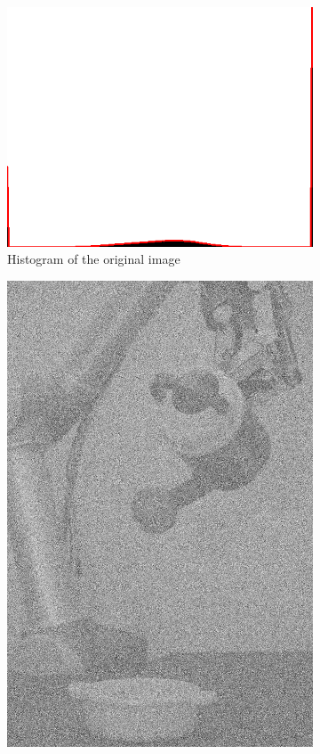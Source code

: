 \begin{figure}[H]
\begin{subfigure}[b]{0.16\textwidth}
        \includegraphics[width=\textwidth]{img2/hist.png}
        \caption{Histogram of the original image}
        \label{fig:img2_hist}
    \end{subfigure}
	 \begin{subfigure}[b]{0.16\textwidth}
        \includegraphics[width=\textwidth]{img2/src.png}

\end{subfigure}
\end{figure}
